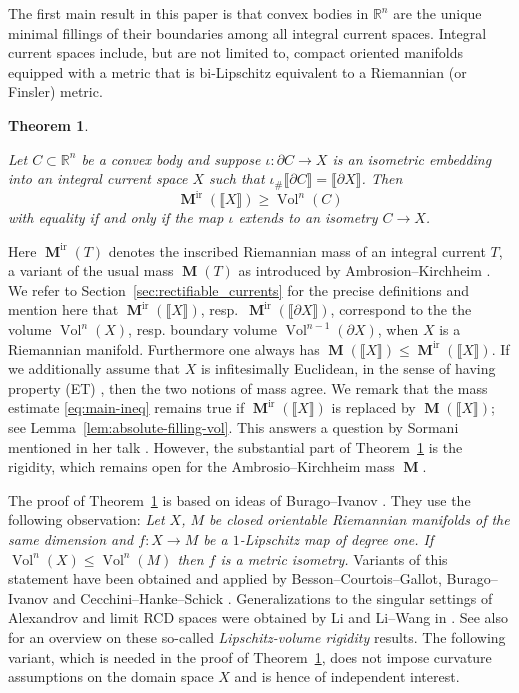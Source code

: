 \documentclass[reqno]{amsart}
\newtheorem{theorem}{Theorem}[section]
\numberwithin{equation}{section}
\newcommand{\R}{\mathbb{R}}
\newcommand{\vol}{\operatorname{Vol}}
\newcommand{\bb}[1]{\llbracket #1\rrbracket}
\newcommand{\susbet}{\subset}
\DeclareMathOperator{\mass}{\mathbf{M}}
\DeclareMathOperator{\ir}{ir}
\begin{document}
The first main result in this paper is that convex bodies in $\mathbb{R}^n$ are 
the unique minimal fillings of their boundaries among all integral current spaces. Integral current spaces include, but are not limited to, compact oriented manifolds equipped with a metric that is bi-Lipschitz equivalent to a Riemannian (or Finsler) metric.

\begin{theorem}
\label{thm:main-i}

Let \(C\susbet \R^n\) be a convex body and suppose \(\iota\colon \partial C\to X\) is an isometric embedding into an integral current space \(X\) such that \(\iota_{\#}\bb{\partial C}=\bb{\partial X}\). Then
\begin{equation}\label{eq:main-ineq}
\mass^{\ir}({\bb{X}})\geq \vol^n(C)
\end{equation}
with equality if and only if the map \(\iota\) extends to an isometry $C\to X$.
\end{theorem}

Here $\mass^{\ir}(T)$ denotes the inscribed Riemannian mass of an integral current $T$, a variant of the usual mass $\mass(T)$ as introduced by Ambrosion--Kirchheim \cite{amb00}. We refer to Section~\ref{sec:rectifiable_currents} for the precise definitions and mention here that $\mass^{\ir}(\bb{X})$, resp.\ $\mass^{\ir}(\bb{\partial X})$, correspond to the the volume $\vol^n(X)$, resp. boundary volume $\vol^{n-1}(\partial X)$, when $X$ is a Riemannian manifold.  Furthermore one always has \(\mass(\bb{X}) \leq \mass^{\ir}(\bb{X})\). If we additionally assume that $X$ is infitesimally Euclidean, in the sense of having property (ET) \cite{lw17}, then the two notions of mass agree. We remark that the mass estimate \eqref{eq:main-ineq} remains true if \(\mass^{\ir}(\bb{X})\) is replaced by \(\mass(\bb{X})\); see Lemma~\ref{lem:absolute-filling-vol}. This answers a question by Sormani mentioned in her talk \cite[57:15-58:00]{sor22}. However, the substantial part of Theorem~\ref{thm:main-i} is the rigidity, which remains open for the Ambrosio--Kirchheim mass $\mass$.

The proof of Theorem~\ref{thm:main-i} is based on ideas of Burago--Ivanov \cite{bi10, bi13}. They use the following observation: \textit{Let $X$, $M$ be closed orientable Riemannian manifolds of the same dimension and $f\colon X\to M$ be a $1$-Lipschitz map of degree one. If $\vol^n(X)\leq \vol^n(M)$ then $f$ is a metric isometry.} Variants of this statement have been obtained and applied by Besson--Courtois--Gallot, Burago--Ivanov and Cecchini--Hanke--Schick \cite{bcg95, bi95, bi10, bi13, chs22}. Generalizations to the singular settings of Alexandrov and limit RCD spaces were obtained by Li and Li--Wang in \cite{li15, lw14}. See also \cite{li20} for an overview on these so-called \emph{Lipschitz-volume rigidity} results. The following variant, which is needed in the proof of Theorem~\ref{thm:main-i}, does not impose curvature assumptions on the domain space $X$ and is hence of independent interest.
\end{document}
